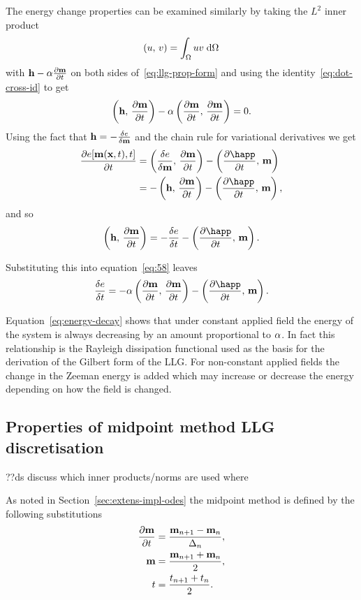The energy change properties can be examined similarly by taking the $L^2$ inner product
\begin{equation}
  \left(u,\, v \right) = \int_\Omega u v {\; \text{d}}\Omega
\end{equation}
with $\mathbf{h} - \alpha \frac{\partial \mathbf{m}}{\partial t}$ on both sides of~\eqref{eq:llg-prop-form} and using the identity~\eqref{eq:dot-cross-id} to get
\begin{equation}
  \label{eq:58}
  \left(\mathbf{h},\, \frac{\partial \mathbf{m}}{\partial t} \right) - \alpha \left(\frac{\partial \mathbf{m}}{\partial t},\, \frac{\partial \mathbf{m}}{\partial t} \right) = 0.
\end{equation}
Using the fact that $\mathbf{h} = -\frac{\delta e}{\delta \mathbf{m}}$ and the chain rule for variational derivatives\cite{??ds} we get
\begin{align*}
  \pd{\e[\mv(\xv, t), t]}{t} &= \ip{\vd{e}{\mv}}{\dmdt} - \ip{\pd{\happ}{t}}{\mv} \\
             &= -\ip{\hv}{\dmdt} - \ip{\pd{\happ}{t}}{\mv},
\end{align*}
and so
\begin{equation}
  \ip{\hv}{\dmdt} = -\vd{\e}{t} - \ip{\pd{\happ}{t}}{\mv}.
\end{equation}

Substituting this into equation~\eqref{eq:58} leaves
\begin{equation}
  \label{eq:energy-decay}
  \vd{\e}{t} = -\dampc \ip{\dmdt}{\dmdt} - \ip{\pd{\happ}{t}}{\mv}.
\end{equation}

Equation~\eqref{eq:energy-decay} shows that under constant applied field the energy of the system is always decreasing by an amount proportional to $\alpha$.
In fact this relationship is the Rayleigh dissipation functional used as the basis for the derivation of the Gilbert form of the LLG.\cite{Gilbert2004}
For non-constant applied fields the change in the Zeeman energy is added which may increase or decrease the energy depending on how the field is changed. %


\subsection{Properties of midpoint method LLG discretisation}
\label{sec:prop-midp-meth}

??ds discuss which inner products/norms are used where

As noted in Section~\ref{sec:extens-impl-odes} the midpoint method is defined by the following substitutions
\begin{align}
  \label{eq:55}
  \frac{\partial \mathbf{m}}{\partial t} &= \frac{\mathbf{m}_{n+1} - \mathbf{m}_n}{\Delta_{n}}, \\
  \mathbf{m} &= \frac{\mathbf{m}_{n+1} + \mathbf{m}_n}{2}, \\
  t &=  \frac{t_{n+1} + t_n}{2}.
\end{align}

